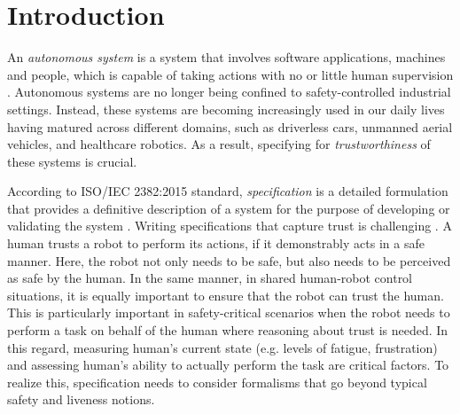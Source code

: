 \documentclass[sigconf]{acmart}
\begin{document}



\maketitle

\section{Introduction}
An \textit{autonomous system} is a system that involves software applications, machines and people, which is capable of taking actions with no or little human supervision \cite{TAS-Hub}. 
Autonomous systems are no longer being confined to safety-controlled industrial settings. 
Instead, these systems are becoming increasingly used in our daily lives having matured across different domains, such as driverless cars, unmanned aerial vehicles, and healthcare robotics. 
As a result, specifying for \textit{trustworthiness} of these systems is crucial. 

According to ISO/IEC 2382:2015 standard, \textit{specification} is a detailed formulation that provides a definitive description of a system for the purpose of developing or validating the system \cite{ISO2382}. 
Writing specifications that capture trust is challenging \cite{Kress-Gazit2021}. 
A human trusts a robot to perform its actions, if it demonstrably acts in a safe manner. 
Here, the robot not only needs to be safe, but also needs to be perceived as safe by the human. 
In the same manner, in shared human-robot control situations, it is equally important to ensure that the robot can trust the human. 
This is particularly important in safety-critical scenarios when the robot needs to perform a task on behalf of the human where reasoning about trust is needed. 
In this regard, measuring human's current state (e.g. levels of fatigue, frustration) and assessing human's ability to actually perform the task are critical factors. 
To realize this, specification needs to consider formalisms that go beyond typical safety and liveness notions. 
\end{document}
